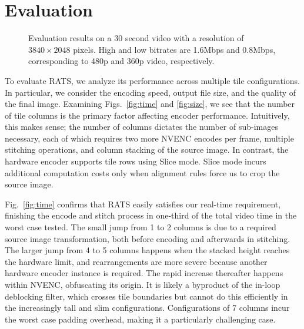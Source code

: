 \section{Evaluation} \label{eval}

\begin{figure*}[t]
	\centering
    \hfill
    \hfill
	\caption{Evaluation results on a 30 second video with a resolution of $3840\times2048$ pixels. High and low bitrates are 1.6Mbps and 0.8Mbps, corresponding to 480p and 360p video, respectively.\protect\footnotemark}
	\label{fig:eval}
\end{figure*}
To evaluate RATS, we analyze its performance across multiple tile configurations. In particular, we consider the encoding speed, output file size, and the quality of the final image.
%
Examining Figs.~\ref{fig:time} and \ref{fig:size}, we see that the number of tile columns is the primary factor affecting encoder performance. Intuitively, this makes sense; the number of columns dictates the number of sub-images necessary, each of which requires two more NVENC encodes per frame, multiple stitching operations, and column stacking of the source image. In contrast, the hardware encoder supports tile rows using Slice mode. Slice mode incurs additional computation costs only when alignment rules force us to crop the source image.

Fig.~\ref{fig:time} confirms that RATS easily satisfies our real-time requirement, finishing the encode and stitch process in one-third of the total video time in the worst case tested.
The small jump from 1 to 2 columns is due to a required source image transformation, both before encoding and afterwards in stitching.
The larger jump from 4 to 5 columns happens when the stacked height reaches the hardware limit, and rearrangements are more severe because another hardware encoder instance is required.
The rapid increase thereafter happens within NVENC, obfuscating its origin.
It is likely a byproduct of the in-loop deblocking filter, which crosses tile boundaries but cannot do this efficiently in the increasingly tall and slim configurations. Configurations of 7 columns incur the worst case padding overhead, making it a particularly challenging case.

